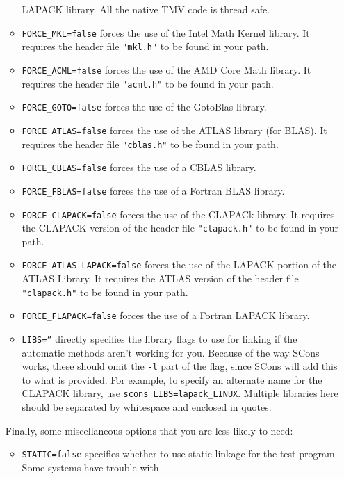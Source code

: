 \begin{enumerate}
\begin{itemize}
LAPACK library.  All the native TMV code is thread safe.
\item \texttt{FORCE\_MKL=false} forces the use of the Intel Math Kernel library. 
It requires the header file \texttt{"mkl.h"} to be found in your path. 
\item \texttt{FORCE\_ACML=false} forces the use of the AMD Core Math library.  
It requires the header file \texttt{"acml.h"} to be found in your path.
\item \texttt{FORCE\_GOTO=false} forces the use of the GotoBlas library.  
\item \texttt{FORCE\_ATLAS=false} forces the use of the ATLAS library (for BLAS).  
It requires the header file \texttt{"cblas.h"} to be found in your path.
\item \texttt{FORCE\_CBLAS=false} forces the use of a CBLAS library.
\item \texttt{FORCE\_FBLAS=false} forces the use of a Fortran BLAS library.
\item \texttt{FORCE\_CLAPACK=false} forces the use of the CLAPACk library. 
It requires the CLAPACK version of the header file \texttt{"clapack.h"} to be found in your path.
\item \texttt{FORCE\_ATLAS\_LAPACK=false} forces the use of the LAPACK portion
of the ATLAS Library.  
It requires the ATLAS version of the header file \texttt{"clapack.h"} to be found in your path.
\item \texttt{FORCE\_FLAPACK=false} forces the use of a Fortran LAPACK library.
\item \texttt{LIBS=''} directly specifies the library flags to use for linking if the automatic methods aren't working for you.  Because of the way SCons works,
these should omit the \texttt{-l} part of the flag, since SCons will add this to what is provided.
For example, to specify an alternate name for the CLAPACK library, use 
\texttt{scons LIBS=lapack\_LINUX}.  Multiple libraries here should be separated by 
whitespace and enclosed in quotes.
\end{itemize}
Finally, some miscellaneous options that you are less likely to need:
\begin{itemize}
\item \texttt{STATIC=false} specifies whether to use static linkage for the test program.  Some systems have trouble with

\end{itemize}
\end{enumerate}
